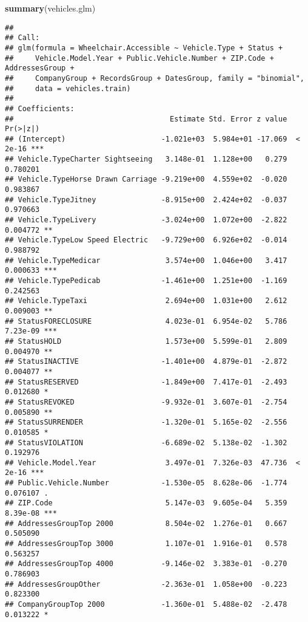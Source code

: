 \documentclass[
]{article}
\newenvironment{Shaded}{\begin{snugshade}}{\end{snugshade}}
\newcommand{\FunctionTok}[1]{\textcolor[rgb]{0.13,0.29,0.53}{\textbf{#1}}}
\newcommand{\NormalTok}[1]{#1}
\begin{document}
\begin{Shaded}
\begin{Highlighting}[]
\FunctionTok{summary}\NormalTok{(vehicles.glm)}
\end{Highlighting}
\end{Shaded}

\begin{verbatim}
## 
## Call:
## glm(formula = Wheelchair.Accessible ~ Vehicle.Type + Status + 
##     Vehicle.Model.Year + Public.Vehicle.Number + ZIP.Code + AddressesGroup + 
##     CompanyGroup + RecordsGroup + DatesGroup, family = "binomial", 
##     data = vehicles.train)
## 
## Coefficients:
##                                    Estimate Std. Error z value Pr(>|z|)    
## (Intercept)                      -1.021e+03  5.984e+01 -17.069  < 2e-16 ***
## Vehicle.TypeCharter Sightseeing   3.148e-01  1.128e+00   0.279 0.780201    
## Vehicle.TypeHorse Drawn Carriage -9.219e+00  4.559e+02  -0.020 0.983867    
## Vehicle.TypeJitney               -8.915e+00  2.424e+02  -0.037 0.970663    
## Vehicle.TypeLivery               -3.024e+00  1.072e+00  -2.822 0.004772 ** 
## Vehicle.TypeLow Speed Electric   -9.729e+00  6.926e+02  -0.014 0.988792    
## Vehicle.TypeMedicar               3.574e+00  1.046e+00   3.417 0.000633 ***
## Vehicle.TypePedicab              -1.461e+00  1.251e+00  -1.169 0.242563    
## Vehicle.TypeTaxi                  2.694e+00  1.031e+00   2.612 0.009003 ** 
## StatusFORECLOSURE                 4.023e-01  6.954e-02   5.786 7.23e-09 ***
## StatusHOLD                        1.573e+00  5.599e-01   2.809 0.004970 ** 
## StatusINACTIVE                   -1.401e+00  4.879e-01  -2.872 0.004077 ** 
## StatusRESERVED                   -1.849e+00  7.417e-01  -2.493 0.012680 *  
## StatusREVOKED                    -9.932e-01  3.607e-01  -2.754 0.005890 ** 
## StatusSURRENDER                  -1.320e-01  5.165e-02  -2.556 0.010585 *  
## StatusVIOLATION                  -6.689e-02  5.138e-02  -1.302 0.192976    
## Vehicle.Model.Year                3.497e-01  7.326e-03  47.736  < 2e-16 ***
## Public.Vehicle.Number            -1.530e-05  8.628e-06  -1.774 0.076107 .  
## ZIP.Code                          5.147e-03  9.605e-04   5.359 8.39e-08 ***
## AddressesGroupTop 2000            8.504e-02  1.276e-01   0.667 0.505090    
## AddressesGroupTop 3000            1.107e-01  1.916e-01   0.578 0.563257    
## AddressesGroupTop 4000           -9.146e-02  3.383e-01  -0.270 0.786903    
## AddressesGroupOther              -2.363e-01  1.058e+00  -0.223 0.823300    
## CompanyGroupTop 2000             -1.360e-01  5.488e-02  -2.478 0.013222 *  

\end{verbatim}
\end{document}
